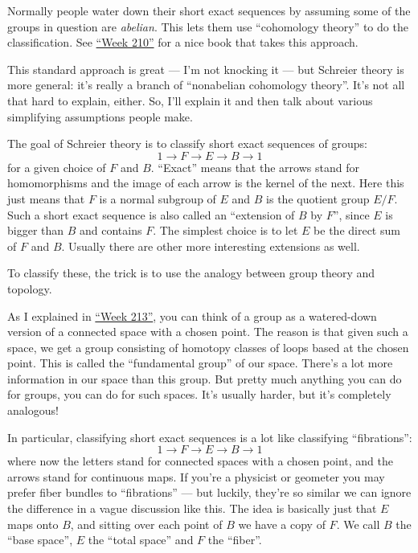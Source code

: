 \documentclass{article}
\begin{document}
Normally people water down their short exact sequences by assuming some
of the groups in question are \emph{abelian}. This lets them use
``cohomology theory'' to do the classification. See
\protect\hyperlink{week210}{``Week 210''} for a nice book that takes
this approach.

This standard approach is great --- I'm not knocking it --- but Schreier
theory is more general: it's really a branch of ``nonabelian cohomology
theory''. It's not all that hard to explain, either. So, I'll explain it
and then talk about various simplifying assumptions people make.

The goal of Schreier theory is to classify short exact sequences of
groups: \[1 \to F \to E \to B \to 1\] for a given choice of \(F\) and
\(B\). ``Exact'' means that the arrows stand for homomorphisms and the
image of each arrow is the kernel of the next. Here this just means that
\(F\) is a normal subgroup of \(E\) and \(B\) is the quotient group
\(E/F\). Such a short exact sequence is also called an ``extension of
\(B\) by \(F\)'', since \(E\) is bigger than \(B\) and contains \(F\).
The simplest choice is to let \(E\) be the direct sum of \(F\) and
\(B\). Usually there are other more interesting extensions as well.

To classify these, the trick is to use the analogy between group theory
and topology.

As I explained in \protect\hyperlink{week213}{``Week 213''}, you can
think of a group as a watered-down version of a connected space with a
chosen point. The reason is that given such a space, we get a group
consisting of homotopy classes of loops based at the chosen point. This
is called the ``fundamental group'' of our space. There's a lot more
information in our space than this group. But pretty much anything you
can do for groups, you can do for such spaces. It's usually harder, but
it's completely analogous!

In particular, classifying short exact sequences is a lot like
classifying ``fibrations'': \[1 \to F \to E \to B \to 1\] where now the
letters stand for connected spaces with a chosen point, and the arrows
stand for continuous maps. If you're a physicist or geometer you may
prefer fiber bundles to ``fibrations'' --- but luckily, they're so
similar we can ignore the difference in a vague discussion like this.
The idea is basically just that \(E\) maps onto \(B\), and sitting over
each point of \(B\) we have a copy of \(F\). We call \(B\) the ``base
space'', \(E\) the ``total space'' and \(F\) the ``fiber''.
\end{document}
